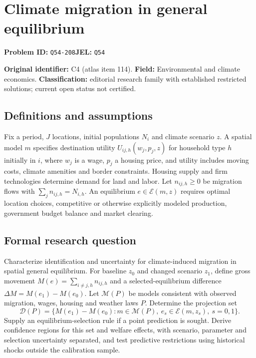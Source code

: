 \documentclass[11pt,a4paper]{article}
\begin{document}
\section*{Climate migration in general equilibrium}
\textbf{Problem ID:} \texttt{Q54-208}\quad \textbf{JEL:} \texttt{Q54}\par
\label{problem:OP-0114}
\label{audited:ECON-041}


\label{atlas:prob:C4}

\noindent\textbf{Original identifier:} C4 (atlas item 114). \textbf{Field:} Environmental and climate economics. \textbf{Classification:} editorial research family with established restricted solutions; current open status not certified.

\subsection*{Definitions and assumptions}

Fix a period, $J$ locations, initial populations $N_i$ and climate scenario $z$. A spatial model $m$ specifies destination utility $U_{ij,h}(w_j,p_j,z)$ for household type $h$ initially in $i$, where $w_j$ is a wage, $p_j$ a housing price, and utility includes moving costs, climate amenities and border constraints. Housing supply and firm technologies determine demand for land and labor. Let $n_{ij,h}\ge0$ be migration flows with $\sum_j n_{ij,h}=N_{i,h}$. An equilibrium $e\in\mathcal E(m,z)$ requires optimal location choices, competitive or otherwise explicitly modeled production, government budget balance and market clearing.

\subsection*{Formal research question}

Characterize identification and uncertainty for climate-induced migration in spatial general equilibrium. For baseline $z_0$ and changed scenario $z_1$, define gross movement $M(e)=\sum_{i\ne j,h}n_{ij,h}$ and a selected-equilibrium difference $\Delta M=M(e_1)-M(e_0)$. Let $\mathcal M(P)$ be models consistent with observed migration, wages, housing and weather laws $P$. Determine the projection set
\[
\mathcal D(P)=
\{M(e_1)-M(e_0):m\in\mathcal M(P),
\ e_s\in\mathcal E(m,z_s),\ s=0,1\}.
\]
Supply an equilibrium-selection rule if a point prediction is sought. Derive confidence regions for this set and welfare effects, with scenario, parameter and selection uncertainty separated, and test predictive restrictions using historical shocks outside the calibration sample.
\end{document}
